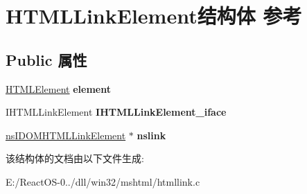 \hypertarget{struct_h_t_m_l_link_element}{}\section{H\+T\+M\+L\+Link\+Element结构体 参考}
\label{struct_h_t_m_l_link_element}
\subsection*{Public 属性}
\begin{DoxyCompactItemize}
\item 
\mbox{\label{struct_h_t_m_l_link_element_a02b94fb2efdd9ef976f81be2ae527d9b}} 
\hyperlink{struct_h_t_m_l_element}{H\+T\+M\+L\+Element} {\bfseries element}
\item 
\mbox{\label{struct_h_t_m_l_link_element_a494bc3e7da61c4efe1910a182af7e567}} 
I\+H\+T\+M\+L\+Link\+Element {\bfseries I\+H\+T\+M\+L\+Link\+Element\+\_\+iface}
\item 
\mbox{\label{struct_h_t_m_l_link_element_a853dda0b4234ca9f6eb32e4e7a651293}} 
\hyperlink{interfacens_i_d_o_m_h_t_m_l_link_element}{ns\+I\+D\+O\+M\+H\+T\+M\+L\+Link\+Element} $\ast$ {\bfseries nslink}
\end{DoxyCompactItemize}


该结构体的文档由以下文件生成\+:\begin{DoxyCompactItemize}
\item 
E\+:/\+React\+O\+S-\/0../dll/win32/mshtml/htmllink.\+c\end{DoxyCompactItemize}
